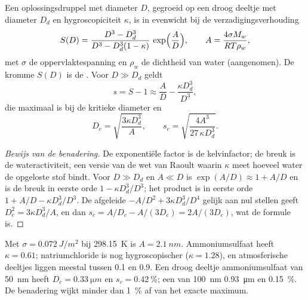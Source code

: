 \begin{proposition}[Köhlerkromme]\label{prop:b2:atmospheric-thermodynamics:kohler}
Een oplossingsdruppel met diameter $D$, gegroeid op een droog deeltje met diameter $D_d$ en hygroscopiciteit
$\kappa$, is in evenwicht bij de verzadigingsverhouding
\[
  S(D) = \frac{D^3 - D_d^3}{D^3 - D_d^3(1 - \kappa)}\,\exp\Bigl(\frac{A}{D}\Bigr), \qquad
  A = \frac{4\sigma M_w}{R T\rho_w},
\]
met $\sigma$ de oppervlaktespanning en $\rho_w$ de dichtheid van water (aangenomen). De kromme $S(D)$
is de \emph{}. Voor $D \gg D_d$ geldt
\[
  s = S - 1 \approx \frac{A}{D} - \frac{\kappa D_d^3}{D^3},
\]
die maximaal is bij de kritieke diameter en 
\[
  D_c = \sqrt{\frac{3\kappa D_d^3}{A}}, \qquad s_c = \sqrt{\frac{4A^3}{27\,\kappa D_d^3}} .
\]
\end{proposition}

\begin{proof}[Bewijs van de benadering]
De exponentiële factor is de kelvinfactor; de breuk is de wateractiviteit, een versie van de wet van
Raoult waarin $\kappa$ meet hoeveel water de opgeloste stof bindt. Voor $D \gg D_d$ en
$A \ll D$ is $\exp(A/D) \approx 1 + A/D$ en is de breuk in eerste orde $1 - \kappa D_d^3/D^3$;
het product is in eerste orde $1 + A/D - \kappa D_d^3/D^3$. De afgeleide
$-A/D^2 + 3\kappa D_d^3/D^4$ gelijk aan nul stellen geeft $D_c^2 = 3\kappa D_d^3/A$, en dan $s_c = A/D_c -
A/(3D_c) = 2A/(3D_c)$, wat de formule is.
\end{proof}

Met $\sigma = \qty{0.072}{J/m^2}$ bij \qty{298.15}{K} is $A = \qty{2.1}{nm}$. Ammoniumsulfaat heeft
$\kappa = 0.61$; natriumchloride is nog hygroscopischer ($\kappa = 1.28$), en atmosferische deeltjes liggen meestal tussen 0.1 en 0.9.
Een droog deeltje ammoniumsulfaat van \qty{50}{nm} heeft $D_c = \qty{0.33}{\micro m}$ en $s_c =
\qty{0.42}{\percent}$; een van \qty{100}{nm} \qty{0.93}{\micro m} en \qty{0.15}{\percent}. De
benadering wijkt minder dan \qty{1}{\percent} af van het exacte maximum.

